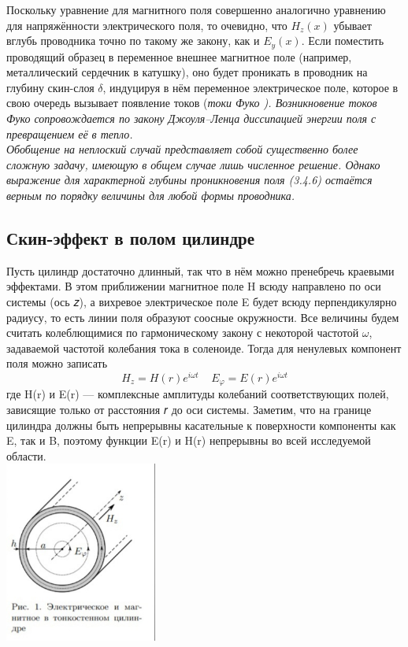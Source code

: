 \documentclass[a4paper]{article}
\begin{document}
Поскольку уравнение для магнитного поля  совершенно аналогично уравнению для напряжённости электрического поля, то очевидно, что $H_z(x)$ убывает вглубь проводника точно по такому же закону,
как и $E_y(x)$. Если поместить проводящий образец в переменное внешнее магнитное поле (например, металлический сердечник в катушку), оно будет проникать в проводник на глубину скин-слоя $\delta$, индуцируя в нём переменное электрическое поле, которое в свою очередь вызывает появление токов (\em токи Фуко \em). Возникновение токов Фуко сопровождается по закону Джоуля–Ленца диссипацией энергии поля с превращением её в тепло.\\
Обобщение на неплоский случай представляет собой существенно более сложную задачу, имеющую в общем случае лишь численное решение.
Однако выражение для характерной глубины проникновения поля (3.4.6)
остаётся верным по порядку величины для любой формы проводника.\\
\subsection{Скин-эффект в полом цилиндре}
Пусть цилиндр достаточно длинный,
так что в нём можно пренебречь краевыми эффектами. В этом приближении
магнитное поле H всюду направлено по
оси системы (ось 𝑧), а вихревое электрическое поле E будет всюду перпендикулярно радиусу, то есть линии поля образуют соосные окружности. Все
величины будем считать колеблющимися по гармоническому закону с некоторой
частотой $\omega$, задаваемой частотой колебания тока в соленоиде. Тогда для ненулевых компонент поля можно записать
$$H_z = H(r)e^{i\omega t} \; \; \; \; E_{\varphi} = E(r)e^{i \omega t}$$
где H(r) и E(r) — комплексные амплитуды колебаний соответствующих
полей, зависящие только от расстояния 𝑟 до оси системы. Заметим, что
на границе цилиндра должны быть непрерывны касательные к поверхности компоненты как E, так и B, поэтому функции E(r) и H(r) непрерывны во всей исследуемой области.\\
\includegraphics[width=5cm]{g7}\\
\end{document}
